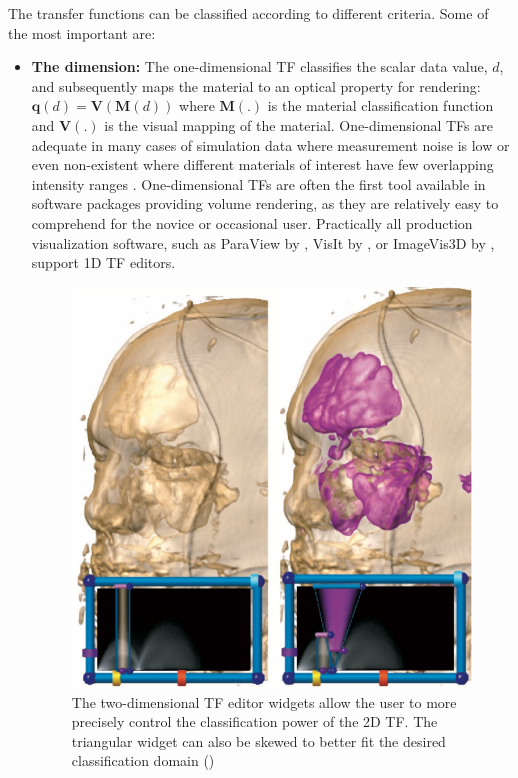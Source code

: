The transfer functions can be classified according to different criteria. Some of the most important are:

\begin{itemize}
\item \textbf{The dimension: } The one-dimensional TF classifies the scalar data value, $d$, and subsequently maps the material to an optical property for rendering: $ \textbf{q}(d)=\textbf{V}(\textbf{M}(d))$ where $\textbf{M}(.)$ is the material classification function and $\textbf{V}(.)$ is the
visual mapping of the material. One-dimensional TFs are adequate in many cases of simulation data where measurement noise is low or even non-existent where different materials of interest have few overlapping intensity
ranges \cite{4303986}. One-dimensional TFs are often the first tool available in software packages providing volume rendering, as they are relatively easy to comprehend for the novice or occasional user. Practically all production
visualization software, such as ParaView by \cite{paraview},
 VisIt by \cite{Childs:SciDAC2011}, 
or ImageVis3D by {\cite{Fogal2010Tuvok}}, support 1D TF editors.

\begin{figure}[th]
\centering
\includegraphics[width=\textwidth]{Figures/2dtf}
\decoRule
\caption[2D transfer Function]{ The two-dimensional TF editor widgets allow the user
to more precisely control the classification power of the 2D TF.
The triangular widget can also be skewed to better fit the desired
classification domain (\cite{1021579}) }
\label{fig:tf2d}
\end{figure}


\end{itemize}
